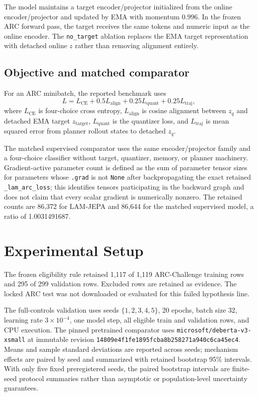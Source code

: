 \documentclass{article}
\begin{document}
The model maintains a target encoder/projector initialized from the online encoder/projector and updated by EMA with momentum $0.996$. In the frozen ARC forward pass, the target receives the same tokens and numeric input as the online encoder. The \texttt{no\_target} ablation replaces the EMA target representation with detached online $z$ rather than removing alignment entirely.

\subsection{Objective and matched comparator}
For an ARC minibatch, the reported benchmark uses
\[
L = L_{\mathrm{CE}} + 0.5L_{\mathrm{align}} + 0.25L_{\mathrm{quant}} + 0.25L_{\mathrm{traj}},
\]
where $L_{\mathrm{CE}}$ is four-choice cross entropy, $L_{\mathrm{align}}$ is cosine alignment between $z_q$ and detached EMA target $z_{\mathrm{target}}$, $L_{\mathrm{quant}}$ is the quantizer loss, and $L_{\mathrm{traj}}$ is mean squared error from planner rollout states to detached $z_q$.

The matched supervised comparator uses the same encoder/projector family and a four-choice classifier without target, quantizer, memory, or planner machinery. Gradient-active parameter count is defined as the sum of parameter tensor sizes for parameters whose \texttt{.grad} is not \texttt{None} after backpropagating the exact retained \texttt{\_lam\_arc\_loss}; this identifies tensors participating in the backward graph and does not claim that every scalar gradient is numerically nonzero. The retained counts are 86,372 for LAM-JEPA and 86,644 for the matched supervised model, a ratio of 1.0031491687.

\section{Experimental Setup}
The frozen eligibility rule retained 1,117 of 1,119 ARC-Challenge training rows and 295 of 299 validation rows. Excluded rows are retained as evidence. The locked ARC test was not downloaded or evaluated for this failed hypothesis line.

The full-controls validation uses seeds $\{1,2,3,4,5\}$, 20 epochs, batch size 32, learning rate $3\times10^{-4}$, one model step, all eligible train and validation rows, and CPU execution. The pinned pretrained comparator uses \texttt{microsoft/deberta-v3-xsmall} at immutable revision \texttt{14809e4f1fe1895fcba8b258271a940c6ca45ec4}. Means and sample standard deviations are reported across seeds; mechanism effects are paired by seed and summarized with retained bootstrap 95\% intervals. With only five fixed preregistered seeds, the paired bootstrap intervals are finite-seed protocol summaries rather than asymptotic or population-level uncertainty guarantees.
\end{document}
